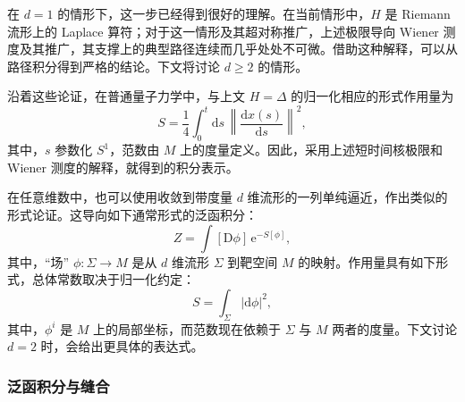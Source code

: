 在 $d=1$ 的情形下，这一步已经得到很好的理解。在当前情形中，$H$ 是 Riemann 流形上的 Laplace 算符；对于这一情形及其超对称推广，上述极限导向 Wiener 测度及其推广，其支撑上的典型路径连续而几乎处处不可微。借助这种解释，可以从路径积分得到严格的结论。下文将讨论 $d\ge2$ 的情形。

沿着这些论证，在普通量子力学中，与上文 $H=\Delta$ 的归一化相应的形式作用量为
\[
S=\frac14\int_0^t\mathrm{d}s\,
\left\|\frac{\mathrm{d}x(s)}{\mathrm{d}s}\right\|^2,
\]
其中，$s$ 参数化 $S^1$，范数由 $M$ 上的度量定义。因此，采用上述短时间核极限和 Wiener 测度的解释，就得到的积分表示。

在任意维数中，也可以使用收敛到带度量 $d$ 维流形的一列单纯逼近，作出类似的形式论证。这导向如下通常形式的泛函积分：
\begin{equation}\label{eq:3.14}
Z=\int[\mathrm{D}\phi]\,\mathrm{e}^{-S[\phi]},
\end{equation}
其中，“场” $\phi\colon\Sigma\to M$ 是从 $d$ 维流形 $\Sigma$ 到靶空间 $M$ 的映射。作用量具有如下形式，总体常数取决于归一化约定：
\begin{equation}\label{eq:3.15}
S=\int_\Sigma|\mathrm{d}\phi|^2,
\end{equation}
其中，$\phi^i$ 是 $M$ 上的局部坐标，而范数现在依赖于 $\Sigma$ 与 $M$ 两者的度量。下文讨论 $d=2$ 时，会给出更具体的表达式。

\subsubsection{泛函积分与缝合}\label{sec:3.1.2.1}

